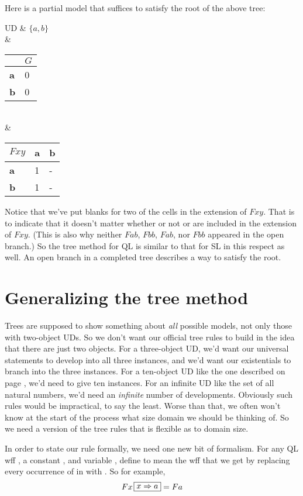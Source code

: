 Here is a partial model that suffices to satisfy the root of the above tree:
\begin{partialmodel}
	UD & $\{a, b\}$\\
	 & \begin{tabular}{l|l}
	           & $G$ \\ \hline
		\textbf{a} & 0          \\
		\textbf{b} & 0         
		\end{tabular}\\
	 & \begin{tabular}{l|ll} $Fxy$        & \textbf{a} & \textbf{b} \\ \hline
		\textbf{a} & 1          & -  \\
		\textbf{b} & 1          &  -
		\end{tabular}
\end{partialmodel}

Notice that we've put blanks for two of the cells in the extension of $Fxy$. That is to indicate that it doesn't matter whether or not  or  are included in the extension of $Fxy$. (This is also why neither $Fab$, $Fbb$, \enot $Fab$, nor \enot $Fbb$ appeared in the open branch.) So the tree method for QL is similar to that for SL in this respect as well. An open branch in a completed tree describes a way to satisfy the root.

\section{Generalizing the tree method}

Trees are supposed to show something about \emph{all} possible models, not only those with two-object UDs. So we don't want our official tree rules to build in the idea that there are just two objects. For a three-object UD, we'd want our universal statements to develop into all three instances, and we'd want our existentials to branch into the three instances. For a ten-object UD like the one described on page \pageref{10UD}, we'd need to give ten instances. For an infinite UD like the set of all natural numbers, we'd need an \emph{infinite} number of developments. Obviously such rules would be impractical, to say the least. Worse than that, we often won't know at the start of the process what size domain we should be thinking of. So we need a version of the tree rules that is flexible as to domain size.

In order to state our rule formally, we need one new bit of formalism. For any QL wff \metaA{}, a constant , and variable , define \metaA{} to mean the wff that we get by replacing every occurrence of  in \metaA{} with . So for example, $$Fx\substitute{x}{a} = Fa$$

